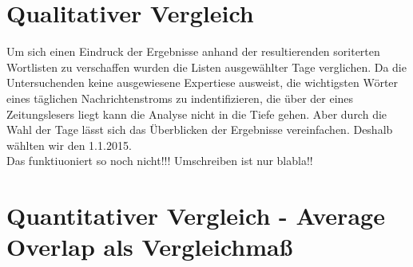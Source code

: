 \section{Qualitativer Vergleich}
Um sich einen Eindruck der Ergebnisse anhand der resultierenden soriterten Wortlisten zu verschaffen wurden die Listen ausgew\"ahlter Tage verglichen. Da die Untersuchenden keine ausgewiesene Expertiese ausweist, die wichtigsten W\"orter eines t\"aglichen Nachrichtenstroms zu indentifizieren, die \"uber der eines Zeitungslesers liegt kann die Analyse nicht in die Tiefe gehen. Aber durch die Wahl der Tage l\"asst sich das \"Uberblicken der Ergebnisse vereinfachen. Deshalb w\"ahlten wir den 1.1.2015. \\
 Das funktiuoniert so noch nicht!!! Umschreiben ist nur blabla!!
\section{Quantitativer Vergleich - Average Overlap als Vergleichma\ss}
